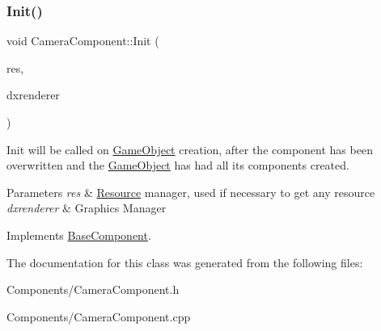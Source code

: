 \subsubsection{\texorpdfstring{Init()}{Init()}}
{\footnotesize\ttfamily void Camera\+Component\+::\+Init (\begin{DoxyParamCaption}\item[{\hyperlink{classResourceManager}{Resource\+Manager} $\ast$}]{res,  }\item[{\hyperlink{classDXRenderer}{D\+X\+Renderer} $\ast$}]{dxrenderer }\end{DoxyParamCaption})\hspace{0.3cm}{\ttfamily [virtual]}}



Init will be called on \hyperlink{classGameObject}{Game\+Object} creation, after the component has been overwritten and the \hyperlink{classGameObject}{Game\+Object} has had all its components created. 


\begin{DoxyParams}{Parameters}
{\em res} & \hyperlink{structResource}{Resource} manager, used if necessary to get any resource \\
\hline
{\em dxrenderer} & Graphic\textquotesingle{}s Manager \\
\hline
\end{DoxyParams}


Implements \hyperlink{classBaseComponent}{Base\+Component}.



The documentation for this class was generated from the following files\+:\begin{DoxyCompactItemize}
\item 
Components/Camera\+Component.\+h\item 
Components/Camera\+Component.\+cpp\end{DoxyCompactItemize}
